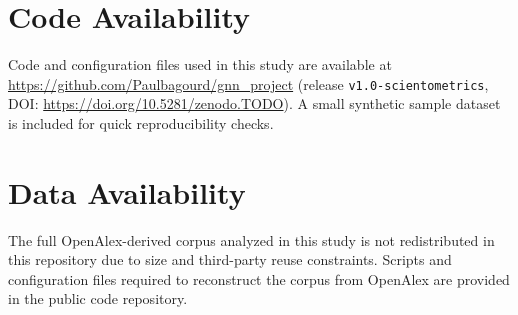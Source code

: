 \documentclass{article}
\begin{document}
\section*{Code Availability}
Code and configuration files used in this study are available at \url{https://github.com/Paulbagourd/gnn_project} (release \texttt{v1.0-scientometrics}, DOI: \url{https://doi.org/10.5281/zenodo.TODO}). A small synthetic sample dataset is included for quick reproducibility checks.

\section*{Data Availability}
The full OpenAlex-derived corpus analyzed in this study is not redistributed in this repository due to size and third-party reuse constraints. Scripts and configuration files required to reconstruct the corpus from OpenAlex are provided in the public code repository.
\end{document}
